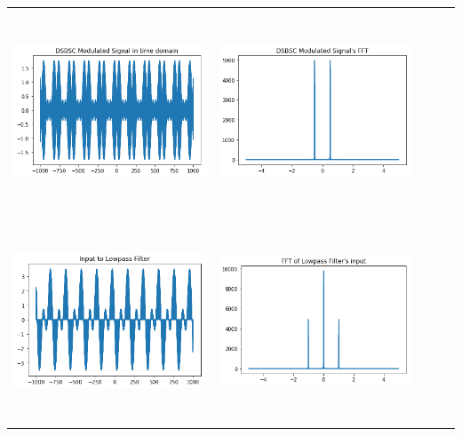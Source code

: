 \documentclass[12pt,a4paper]{article}%
\begin{document}
\begin{flushleft}
\begin{tabular}{ccccc}
   	 {\includegraphics[width=6cm,height=6cm]{./images/modu1.PNG}} & {\includegraphics[width=6cm,height=6cm]{./images/modu_fft1.PNG}}  \\
     {\includegraphics[width=6cm,height=6cm]{./images/inp_lpf1.PNG}} & {\includegraphics[width=6cm,height=6cm]{./images/inp_lpf_fft1.PNG}} 

\end{tabular}
\end{flushleft}
\end{document}
